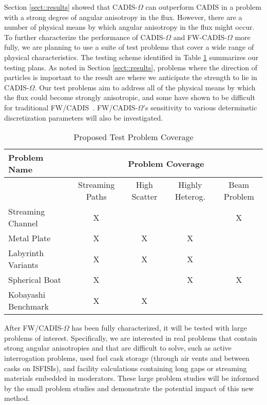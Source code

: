 \documentclass[12pt]{article}
\begin{document}
Section \ref{sect::results} showed that CADIS-$\Omega$ can outperform CADIS in a problem with a strong degree of angular anisotropy in the flux. However, there are a number of physical means by which angular anisotropy in the flux might occur. To further characterize the performance of CADIS-$\Omega$ and FW-CADIS-$\Omega$ more fully, we are planning to use a suite of test problems that cover a wide range of physical characteristics. The testing scheme identified in Table \ref{tab:testprobs} summarizes our testing plans. As noted in Section \ref{sect::results}, problems where the direction of particles is important to the result are where we anticipate the strength to lie in CADIS-$\Omega$. Our test problems aim to address all of the physical means by which the flux could become strongly anisotropic, and some have shown to be difficult for traditional FW/CADIS~\cite{peplow_consistent_2012}. FW/CADIS-$\Omega$'s sensitivity to various determinstic discretization parameters will also be investigated. 

 \begin{table}
  \centering
  \caption{Proposed Test Problem Coverage}
  \begin{tabular}{l|cccc}
    \toprule
    Problem Name & \multicolumn{4}{c}{Problem Coverage} \\
    \hline
     & Streaming Paths & High Scatter & Highly Heterog. & Beam Problem \\
    \hline
    Streaming Channel   & X & & & X \\ 
    Metal Plate         & X & X & X &  \\
    Labyrinth Variants  & X & X & X &  \\ 
    Spherical Boat      & X & & X & X \\  
    Kobayashi Benchmark & X & X &  &  \\   
	\bottomrule
  \end{tabular}
  \label{tab:testprobs}
\end{table}

After FW/CADIS-$\Omega$ has been fully characterized, it will be tested with large problems of interest. 
Specifically, we are interested in real problems that contain strong angular anisotropies and that are difficult to solve, such as active interrogation problems, used fuel cask storage (through air vents and between casks on ISFISIs), and facility calculations containing long gaps or streaming materials embedded in moderators. 
These large problem studies will be informed by the small problem studies and demonstrate the potential impact of this new method. 
\end{document}
